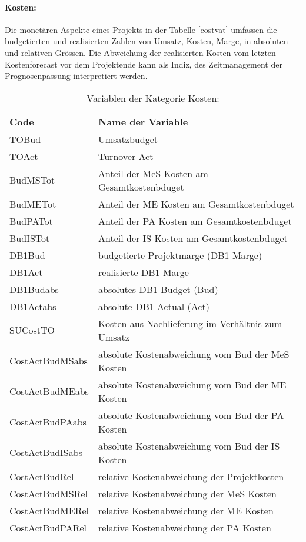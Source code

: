 \paragraph{Kosten:} Die monetären Aspekte eines Projekts in der Tabelle \ref{costvat} umfassen die budgetierten und realisierten Zahlen von Umsatz, Kosten, Marge, in absoluten und relativen Grössen. Die Abweichung der realisierten Kosten vom letzten Kostenforecast vor dem Projektende kann als Indiz, des Zeitmanagement der Prognosenpassung interpretiert werden. 
\begin{table}[htbp]
	\centering
	\caption{Variablen der Kategorie Kosten:}
	\begin{tabular}{ll}
		\toprule
		\textbf{Code} & \textbf{Name der Variable} \\
		\midrule
		TOBud & Umsatzbudget \\
		TOAct & Turnover Act \\
		BudMSTot & Anteil der MeS Kosten am Gesamtkostenbduget \\
		BudMETot & Anteil der ME Kosten am Gesamtkostenbduget \\
		BudPATot & Anteil der PA Kosten am Gesamtkostenbduget \\
		BudISTot & Anteil der IS Kosten am Gesamtkostenbduget \\
		DB1Bud & budgetierte  Projektmarge (DB1-Marge) \\
		DB1Act & realisierte DB1-Marge \\
		DB1Budabs & absolutes DB1 Budget (Bud) \\
		DB1Actabs & absolute DB1 Actual (Act) \\
		SUCostTO & Kosten aus Nachlieferung im Verhältnis zum Umsatz \\
		CostActBudMSabs & absolute Kostenabweichung vom Bud der MeS Kosten \\
		CostActBudMEabs & absolute Kostenabweichung vom Bud der ME Kosten \\
		CostActBudPAabs & absolute Kostenabweichung vom Bud der PA Kosten \\
		CostActBudISabs & absolute Kostenabweichung vom Bud der IS Kosten \\
		CostActBudRel & relative Kostenabweichung  der Projektkosten \\
		CostActBudMSRel & relative Kostenabweichung der MeS Kosten \\
		CostActBudMERel & relative Kostenabweichung der ME Kosten \\
		CostActBudPARel & relative Kostenabweichung der PA Kosten \\

\end{tabular}
\end{table}
